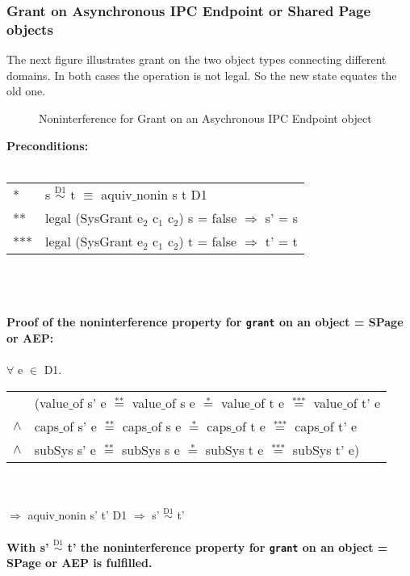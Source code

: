\subsubsection{Grant on Asynchronous IPC Endpoint or Shared Page objects}
The next figure illustrates grant on the two object types connecting different domains. In both cases the operation is not legal. So the new state equates the old one.
\begin{flushleft}
\begin{figure}[H]
\caption{Noninterference for Grant on an Asychronous IPC Endpoint object}
\end{figure}
\end{flushleft}
\textbf{Preconditions:} \\ \\
\begin{tabular}{ll}
* & s $\overset{\text{D1}}{\sim}$ t $\equiv$ aquiv$\_$nonin s t D1	\\ 
** & legal (SysGrant e$_2$ c$_1$ c$_2$) s = false $\Rightarrow$ s' = s \\ 
*** & legal (SysGrant e$_2$ c$_1$ c$_2$) t = false $\Rightarrow$ t' = t
\end{tabular}\\ \\ \\
\textbf{Proof of the noninterference property for \texttt{grant} on an object = SPage or AEP:}\\ \\
$\forall$ e $\in$ D1. \\ 
\begin{tabular}{ll}
& (value$\_$of s' e $\overset{\text{**}}{=}$ value$\_$of s e $\overset{\text{*}}{=}$ value$\_$of t e $\overset{\text{***}}{=}$ value$\_$of t' e \\
$\wedge$ & caps$\_$of s' e $\overset{\text{**}}{=}$ caps$\_$of s e $\overset{\text{*}}{=}$ caps$\_$of t e $\overset{\text{***}}{=}$ caps$\_$of t' e \\
$\wedge$ & subSys s' e $\overset{\text{**}}{=}$ subSys s e $\overset{\text{*}}{=}$ subSys t e $\overset{\text{***}}{=}$ subSys t' e)
\end{tabular} \\ \\
$\Rightarrow$ aquiv$\_$nonin s' t' D1 $\Rightarrow$ s' $\overset{\text{D1}}{\sim}$ t' \\ \\
\textbf{With s' $\overset{\text{D1}}{\sim}$ t' the noninterference property for \texttt{grant} on an object = SPage or AEP is fulfilled.} 